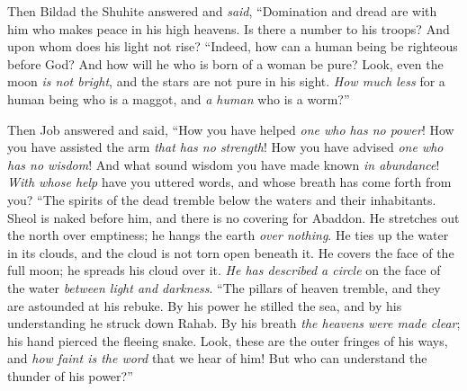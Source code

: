 \begin{biblechapter} %
 Then Bildad the Shuhite answered and \textit{said},
\verse “Domination and dread are with him 
who makes peace in his high heavens.
\verse Is there a number to his troops? 
And upon whom does his light not rise?
\verse “Indeed, how can a human being be righteous before God? 
And how will he who is born of a woman be pure?
\verse Look, even the moon \textit{is not bright}, 
and the stars are not pure in his sight.
\verse \textit{How much less} for a human being who is a maggot, 
and \textit{a human} who is a worm?”
\end{biblechapter}

\begin{biblechapter} %
 Then Job answered and said,
\verse “How you have helped \textit{one who has no power}! 
How you have assisted the arm \textit{that has no strength}!
\verse How you have advised \textit{one who has no wisdom}! 
And what sound wisdom you have made known \textit{in abundance}!
\verse \textit{With whose help} have you uttered words, 
and whose breath has come forth from you?
\verse “The spirits of the dead tremble 
below the waters and their inhabitants.
\verse Sheol is naked before him, 
and there is no covering for Abaddon.
\verse He stretches out the north over emptiness; 
he hangs the earth \textit{over nothing}.
\verse He ties up the water in its clouds, 
and the cloud is not torn open beneath it.
\verse He covers the face of the full moon; 
he spreads his cloud over it.
\verse \textit{He has described a circle} on the face of the water 
\textit{between light and darkness}.
\verse “The pillars of heaven tremble, 
and they are astounded at his rebuke.
\verse By his power he stilled the sea, 
and by his understanding he struck down Rahab.
\verse By his breath \textit{the heavens were made clear}; 
his hand pierced the fleeing snake.
\verse Look, these are the outer fringes of his ways, 
and \textit{how faint is the word} that we hear of him! 
But who can understand the thunder of his power?”
\end{biblechapter}

